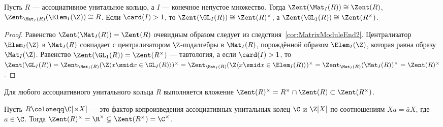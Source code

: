 \documentclass[
	extrafontsizes,
	11pt,
	hyphens,
]{memoir}
\begin{document}


\begin{corollary}
Пусть \(R\) --- ассоциативное унитальное кольцо, а \(I\) --- конечное непустое множество.%
\label{cor:MatrixRingCentre}
Тогда \(\Zent(\Mat_I(R)) \cong \Zent(R)\), \(\Zent_{\Mat_I(R)}(\Elem_I(\Z)) \cong R\).
Если \(\card(I) > 1\), то \(\Zent(\GL_I(R)) \cong \Zent(R)^{\times}\), а \(\Zent(\GL_1(R)) \cong \Zent(R^{\times})\).
\end{corollary}

\begin{proof}
Равенство \(\Zent(\Mat_I(R)) = \Zent(R)\) очевидным образом следует из следствия~\ref{cor:MatrixModuleEnd2}.
Централизатор \(\Elem_I(\Z)\) в \(\Mat_I(R)\) совпадает с централизатором \(\Z\)-подалгебры в \(\Mat_I(R)\), порождённой образом \(\Elem_I(\Z)\), которая равна образу \(\Mat_I(\Z)\).
Равенство \(\Zent(\GL_1(R)) = \Zent(R^{\times})\) --- тавтология,
а если \(\card(I) > 1\), то
\(\Zent(\GL_I(R)) = \Zent_{\Mat_I(R)}(\Z\langle x \smid x \in \GL_I(R) \rangle)^{\times} = \Zent_{\Mat_I(R)}(\Z\langle x \smid x \in \Elem_I(R) \rangle)^{\times} = \Zent_{\Mat_I(R)}(\Mat_I(R))^{\times} = \Zent(R)^{\times}\).
\end{proof}

\begin{remark}
Для любого ассоциативного унитального кольца \(R\) выполняется вложение \(\Zent(R)^{\times} = R^{\times} \cap \Zent(R) \subset \Zent(R^{\times})\).
\end{remark}

\begin{example}
\label{exa:TwPolComplCentInv}
Пусть \(R \coloneqq \C[\rtimes X]\) --- это фактор копроизведения ассоциативных унитальных колец \(\C\) и \(\Z[X]\) по соотношениям \(X a = \bar{a} X\), где \(a \in \C\).
Тогда \(\Zent(R)^{\times} = \R^{\times} \varsubsetneq \Zent(R^{\times}) = \C^{\times}\).
\end{example}
\end{document}
